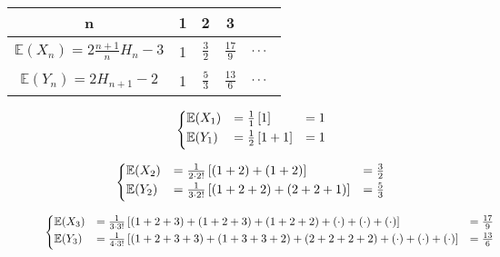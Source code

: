 \documentclass[11pt,fleqn]{article}
\begin{document}
\pagebreak
\begin{table}[!hb]
	\label{bst}
	\begin{tabular}{|c | c | c | c | c|}
		\hline
		n & 1 & 2 & 3 &
		\\ \hline
		$\mathbb{E}(X_n) = 2 \frac{n+1}{n} H_n - 3$ & 1 & $\frac{3}{2}$ & $\frac{17}{9}$ & $\cdots\!\!\!\phantom{{{1\over1}\over{1\over1}}}$ 
		\\ \hline
		$\mathbb{E}(Y_n) = 2 H_{n+1} - 2$ & 1 & $\frac{5}{3}$ & $\frac{13}{6}$ & $\cdots\!\!\!\phantom{{{1\over1}\over{1\over1}}}$ 
		\\ \hline
	\end{tabular}
\end{table}

\begin{description}
	\item[]
		\qquad
		\begin{align*}
			\left\{\begin{matrix*}[l]
			\mathbb{E}(X_1) &= \frac{1}{1} \left[1\right] &= 1 \\
			\mathbb{E}(Y_1) &= \frac{1}{2}\left[1+1\right] &= 1 			 \phantom{\Bigl]} \\
			\end{matrix*}\right.
		\end{align*}
	\item[]
		\qquad
		\begin{align*}
			\left\{\begin{matrix*}[l]
		\mathbb{E}(X_2) &= \frac{1}{2 \cdot 2!} \left[(1+2) + (1+2)\right] 
						&= \frac{3}{2} \\
		\mathbb{E}(Y_2) &= \frac{1}{3 \cdot 2!} \left[(1+2+2) + (2+2+1)\right] 
						&= \frac{5}{3} \phantom{\Bigl]}
			\end{matrix*}\right.
		\end{align*}
	\item[]
		\qquad
		\begin{align*}
			\left\{\begin{matrix*}[l]
			\mathbb{E}(X_3) &= \frac{1}{3 \cdot 3!} 
			\left[(1+2+3)+(1+2+3)+(1+2+2)+(\cdot)+(\cdot)+(\cdot) \right]
						&= \frac{17}{9} \\
			\mathbb{E}(Y_3) &= \frac{1}{4 \cdot 3!}
		\left[(1+2+3+3)+(1+3+3+2)+(2+2+2+2)+(\cdot)+(\cdot)+(\cdot) \right] 
						&= \frac{13}{6}  \phantom{\Bigl]}
			\end{matrix*}\right.
		\end{align*}
\end{description}
\end{document}

